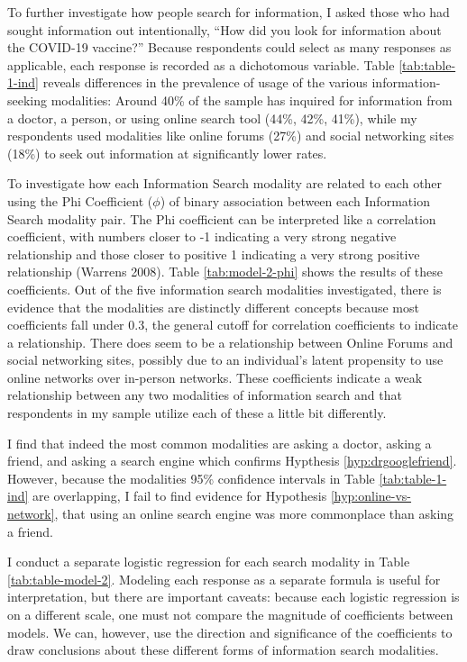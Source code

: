To further investigate how people search for information, I asked those who had
sought information out intentionally, ``How did you look for information about
the COVID-19 vaccine?'' Because respondents could select as many responses as
applicable, each response is recorded as a dichotomous variable. Table
\ref{tab:table-1-ind} reveals differences in the prevalence of usage of the
various information-seeking modalities: Around 40\% of the sample has inquired for
information from a doctor, a person, or using online search tool (44\%, 42\%, 41\%), while my
respondents used modalities like online forums (27\%) and social networking sites (18\%)
to seek out information at significantly lower rates.

To investigate how each
Information Search modality are related to each other using the Phi Coefficient
($\phi$) of binary association between each Information Search modality pair.
The Phi coefficient can be interpreted like a correlation coefficient, with
numbers closer to -1 indicating a very strong negative relationship and those closer to 
positive 1 indicating a very strong positive relationship
(Warrens 2008). Table \ref{tab:model-2-phi} shows the results of these
coefficients. Out of the five information search modalities investigated, there is
evidence that the modalities are distinctly different concepts because most
coefficients fall under 0.3, the general cutoff for correlation
coefficients to indicate a relationship. There does seem to be a relationship
between Online Forums and social networking sites, possibly due to an
individual's latent propensity to use online networks over in-person networks. These
coefficients indicate a weak relationship between any two modalities of
information search and that respondents in my sample utilize each of these a
little bit differently. 

I find that indeed the most common modalities are 
asking a doctor, asking a friend, and asking a search engine which confirms
Hypthesis \ref{hyp:drgooglefriend}. However, because the modalities 95\% confidence intervals 
in Table \ref{tab:table-1-ind}
are overlapping, I fail to find evidence for Hypothesis \ref{hyp:online-vs-network},
that using an online search engine was more commonplace than asking a friend. 



I conduct a separate logistic regression for each search modality in Table \ref{tab:table-model-2}. 
Modeling each response as a separate formula is useful for interpretation, but
there are important caveats: because each logistic regression is on a different
scale, one must not compare the magnitude of coefficients between models. We
can, however, use the direction and significance of the coefficients to draw
conclusions about these different forms of information search modalities.

